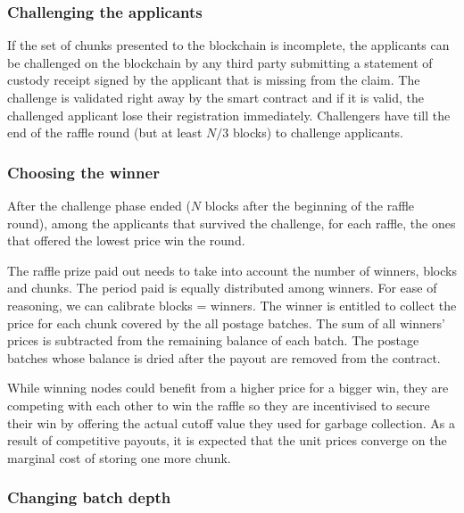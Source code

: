 \subsubsection{Challenging the applicants}

If the set of chunks presented to the blockchain is incomplete, the applicants can be challenged on the blockchain by any third party submitting a statement of custody receipt signed by the applicant that is missing from the claim. The challenge is validated right away by the smart contract and if it is valid, the challenged applicant lose their registration immediately. Challengers have till the end of the raffle round (but at least $N/3$ blocks) to challenge applicants.

\subsubsection{Choosing the winner}

After the challenge phase ended ($N$ blocks after the beginning of the raffle round), among the applicants that survived the challenge, for each raffle, the ones that offered the lowest price win the round. 

The raffle prize paid out needs to take into account the number of winners, blocks and chunks.
The period paid is equally distributed among winners. For ease of reasoning, we can calibrate blocks = winners. The winner is entitled to collect the price for each chunk covered by the all postage batches. The sum of all winners' prices is subtracted from the remaining balance of each batch. The postage batches whose balance is dried after the payout are removed from the contract.

While winning nodes could benefit from a higher price for a bigger win, they are competing with each other to win the raffle so they are incentivised to secure their win by offering the actual cutoff value they used for garbage collection. As a result of competitive payouts, it is expected that the unit prices converge on the marginal cost  of storing one more chunk.

\subsubsection{Changing batch depth}



